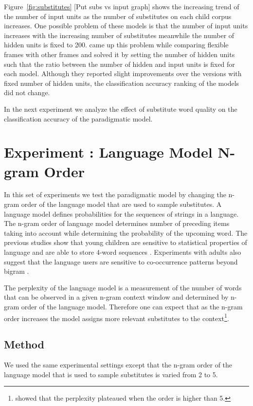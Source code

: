 Figure~\ref{fig:substitutes} [Put subs vs input graph] shows the increasing
trend of the number of input units as the number of substitutes on each child
corpus increases.  One possible problem of these models is that the number of
input units increases with the increasing number of substitutes meanwhile the
number of hidden units is fixed to 200. \cite{clair2010} came up this problem
while comparing flexible frames with other frames and solved it by setting the
number of hidden units such that the ratio between the number of hidden and
input units is fixed for each model.  Although they reported slight
improvements over the versions with fixed number of hidden units, the
classification accuracy ranking of the models did not change. 

In the next experiment we analyze the effect of substitute word quality on the
classification accuracy of the paradigmatic model.

\section{Experiment : Language Model N-gram Order}
\label{s:exp_ngram}

In this set of experiments we test the paradigmatic model by changing the n-gram order of the language model that are
used to sample substitutes. A language model defines probabilities for the sequences of strings in a language.
The n-gram order of language model determines number of preceding items taking into account
while determining the probability of the upcoming word. The previous studies
show that young children are sensitive to statistical properties of language \cite{saffran1996statistical}
and are able to store 4-word sequences \cite{bannard2008stored}. Experiments
with adults also suggest that the language users are sensitive to co-occurrence
patterns beyond bigram \cite{arnon2010more}.

The perplexity of the language model is a measurement of the 
number of words that can be observed in a given n-gram
context window and determined by n-gram order of the language model.  Therefore one can expect that as the n-gram order increases the model assigns more relevant substitutes to the
context\footnote{\cite{Goodman2001403} showed that the perplexity plateaued when
the order is higher than 5.}. 

\subsection{Method}
We used the same experimental settings except that the n-gram order of the
language model that is used to sample substitutes is varied from 2 to
5. 

